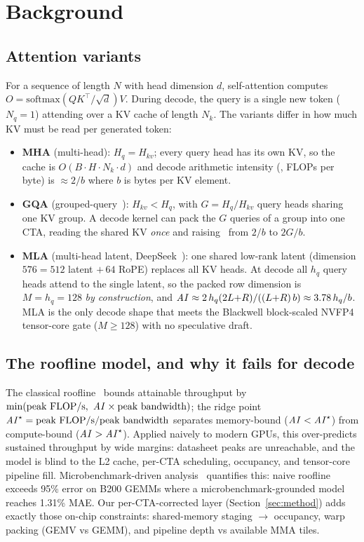 \section{Background}
\label{sec:background}

\subsection{Attention variants}
For a sequence of length $N$ with head dimension $d$, self-attention computes
$O = \mathrm{softmax}(QK^\top/\sqrt{d})V$. During decode, the query is a single
new token ($N_q{=}1$) attending over a KV cache of length $N_k$. The variants
differ in how much KV must be read per generated token:
\begin{itemize}
  \item \textbf{MHA} (multi-head): $H_q{=}H_{kv}$; every query head has its own KV,
  so the cache is $O(B \cdot H \cdot N_k \cdot d)$ and decode arithmetic intensity
  (\ai, FLOPs per byte) is $\approx 2/b$ where $b$ is bytes per KV element.
  \item \textbf{GQA} (grouped-query~\cite{gqa}): $H_{kv} < H_q$, with
  $G{=}H_q/H_{kv}$ query heads sharing one KV group. A decode kernel can pack the
  $G$ queries of a group into one CTA, reading the shared KV \emph{once} and
  raising \ai\ from $2/b$ to $2G/b$.
  \item \textbf{MLA} (multi-head latent, DeepSeek~\cite{deepseekv2,deepseekv3}):
  one shared low-rank latent (dimension $576 = 512$ latent $+\,64$ RoPE) replaces
  all KV heads. At decode all $h_q$ query heads attend to the single latent, so
  the packed row dimension is $M{=}h_q{=}128$ \emph{by construction}, and
  $\mathit{AI} \approx 2\,h_q(2L{+}R)/((L{+}R)\,b) \approx 3.78\,h_q/b$. MLA is the only
  decode shape that meets the Blackwell block-scaled NVFP4 tensor-core gate
  ($M \ge 128$) with no speculative draft.
\end{itemize}

\subsection{The roofline model, and why it fails for decode}
The classical roofline~\cite{roofline} bounds attainable throughput by
$\min(\text{peak FLOP/s},\ \mathit{AI} \times \text{peak bandwidth})$; the ridge point
$\mathit{AI}^\star = \text{peak FLOP/s} / \text{peak bandwidth}$ separates memory-bound
($\mathit{AI} < \mathit{AI}^\star$) from compute-bound ($\mathit{AI} > \mathit{AI}^\star$). Applied naively to
modern GPUs, this over-predicts sustained throughput by wide margins: datasheet
peaks are unreachable, and the model is blind to the L2 cache, per-CTA
scheduling, occupancy, and tensor-core pipeline fill. Microbenchmark-driven
analysis~\cite{roofmethod} quantifies this: naive roofline exceeds 95\% error on
B200 GEMMs where a microbenchmark-grounded model reaches 1.31\% MAE. Our
per-CTA-corrected layer (Section~\ref{sec:method}) adds exactly those on-chip
constraints: shared-memory staging $\to$ occupancy, warp packing (GEMV vs GEMM),
and pipeline depth vs available MMA tiles.

